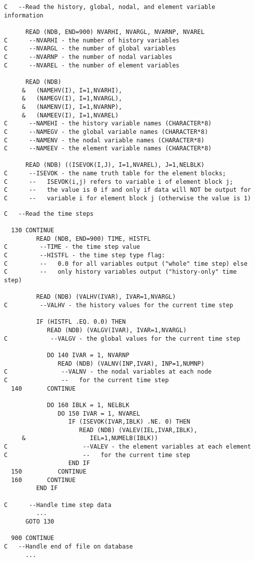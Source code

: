 \newpage
\begin{verbatim}
C   --Read the history, global, nodal, and element variable information

      READ (NDB, END=900) NVARHI, NVARGL, NVARNP, NVAREL
C      --NVARHI - the number of history variables
C      --NVARGL - the number of global variables
C      --NVARNP - the number of nodal variables
C      --NVAREL - the number of element variables

      READ (NDB)
     &   (NAMEHV(I), I=1,NVARHI),
     &   (NAMEGV(I), I=1,NVARGL),
     &   (NAMENV(I), I=1,NVARNP),
     &   (NAMEEV(I), I=1,NVAREL)
C      --NAMEHI - the history variable names (CHARACTER*8)
C      --NAMEGV - the global variable names (CHARACTER*8)
C      --NAMENV - the nodal variable names (CHARACTER*8)
C      --NAMEEV - the element variable names (CHARACTER*8)

      READ (NDB) ((ISEVOK(I,J), I=1,NVAREL), J=1,NELBLK)
C      --ISEVOK - the name truth table for the element blocks;
C      --   ISEVOK(i,j) refers to variable i of element block j;
C      --   the value is 0 if and only if data will NOT be output for
C      --   variable i for element block j (otherwise the value is 1)
\end{verbatim}
\newpage
\begin{verbatim}
C   --Read the time steps

  130 CONTINUE
         READ (NDB, END=900) TIME, HISTFL
C         --TIME - the time step value
C         --HISTFL - the time step type flag:
C         --   0.0 for all variables output ("whole" time step) else
C         --   only history variables output ("history-only" time step)

         READ (NDB) (VALHV(IVAR), IVAR=1,NVARGL)
C         --VALHV - the history values for the current time step

         IF (HISTFL .EQ. 0.0) THEN
            READ (NDB) (VALGV(IVAR), IVAR=1,NVARGL)
C            --VALGV - the global values for the current time step

            DO 140 IVAR = 1, NVARNP
               READ (NDB) (VALNV(INP,IVAR), INP=1,NUMNP)
C               --VALNV - the nodal variables at each node
C               --   for the current time step
  140       CONTINUE

            DO 160 IBLK = 1, NELBLK
               DO 150 IVAR = 1, NVAREL
                  IF (ISEVOK(IVAR,IBLK) .NE. 0) THEN
                     READ (NDB) (VALEV(IEL,IVAR,IBLK),
     &                  IEL=1,NUMELB(IBLK))
C                     --VALEV - the element variables at each element
C                     --   for the current time step
                  END IF
  150          CONTINUE
  160       CONTINUE
         END IF

C      --Handle time step data
         ...
      GOTO 130

  900 CONTINUE
C   --Handle end of file on database
      ...
\end{verbatim}
